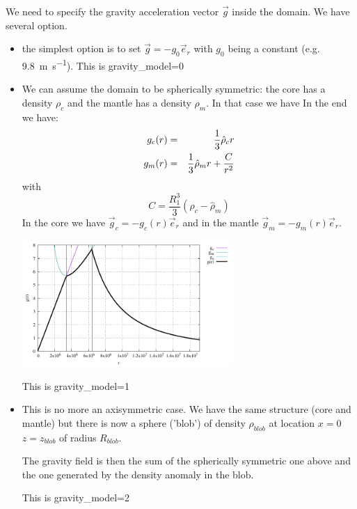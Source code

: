 
We need to specify the gravity acceleration vector $\vec{g}$
inside the domain. 
We have several option. 

\begin{itemize}
\item the simplest option is to set $\vec{g} = - g_0 \vec{e}_r$
with $g_0$ being a constant (e.g. 9.8~\si{\meter\per\second}).
This is {\python gravity\_model=0}


\item We can assume the domain to be spherically symmetric: 
the core has a density $\rho_c$ and the mantle has a density $\rho_m$.
In that case we have
In the end we have:
\begin{eqnarray}
g_c(r)&=& \frac{1}{3}\hat{\rho}_c r \nonumber\\ 
g_m(r)&=& \frac{1}{3}\hat{\rho}_m r +\frac{C}{r^2} 
\end{eqnarray}
with 
\[
C=\frac{R_1^3}{3} (\hat{\rho}_c-\hat{\rho}_m)
\]
In the core we have $\vec{g}_c = - g_c(r) \vec{e}_r$
and in the mantle  $\vec{g}_m = - g_m(r) \vec{e}_r$.

\begin{center}
\includegraphics[width=8cm]{images/bench/g}
\end{center}

This is {\python gravity\_model=1}

\item This is no more an axisymmetric case. We have the same 
structure (core and mantle) but there is now a sphere ('blob')
of density $\rho_{blob}$ at location $x=0$ $z=z_{blob}$ of 
radius $R_{blob}$. 

The gravity field is then the sum of the spherically symmetric one 
above and the one generated by the density anomaly in the blob.

This is {\python gravity\_model=2}

\end{itemize}

